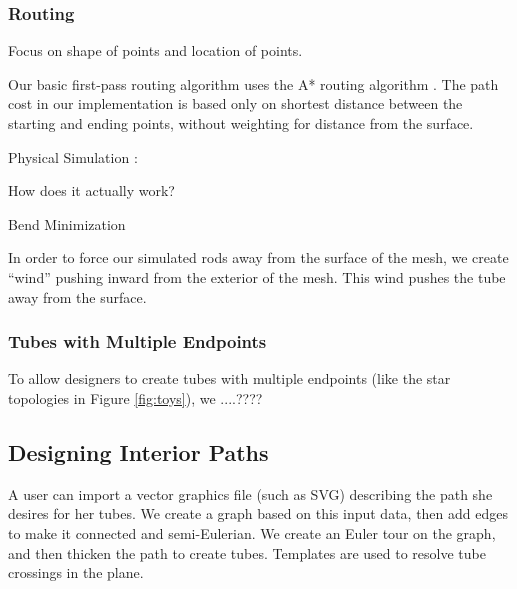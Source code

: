 \subsubsection{Routing}

Focus on shape of points and location of points.

Our basic first-pass routing algorithm uses the A* routing algorithm \cite{Hart-Astar}.  The path cost in our implementation is based only on shortest distance between the starting and ending points, without weighting for distance from the surface.

Physical Simulation : 

How does it actually work? 

Bend Minimization

In order to force our simulated rods away from the surface of the mesh, we create ``wind'' pushing inward from the exterior of the mesh.  This wind pushes the tube away from the surface.

\subsubsection{Tubes with Multiple Endpoints}

To allow designers to create tubes with multiple endpoints (like the star topologies in Figure \ref{fig:toys}), we ....???? 

\subsection{Designing Interior Paths}

A user can import a vector graphics file (such as SVG) describing the path she desires for her tubes.  We create a graph based on this input data, then add edges to make it connected and semi-Eulerian.  We create an Euler tour on the graph, and then thicken the path to create tubes.  Templates are used to resolve tube crossings in the plane.


